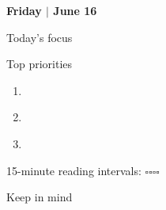 \documentclass{article}
\newcommand{\mydots}{\textcolor{black!20!white}{\tiny\dotfill}}
\newcommand{\mydailyheading}[2]{{
    \fontsize{30}{32}\selectfont\bfseries\color{mypur}#1%
    \hspace{1mm}\color{black}$\vert$%
    \hspace{1mm}\fontsize{16}{18}\selectfont\bfseries\color{myblue}#2}
}
\begin{document}
\begin{day}



\newpage
\null\par\hfill\mydailyheading{Friday}{June 16}\hspace{4mm}
\par\vspace{0.5cm}

\begin{minipage}{0.5\textwidth}
    \begin{tcolorbox}[width=0.98\textwidth,height=0.8in]
        Today's focus
    \end{tcolorbox}
    \begin{tcolorbox}[width=0.98\textwidth,height=1.3in]
        Top priorities
        \begin{enumerate}[leftmargin=*,topsep=15pt,noitemsep,parsep=5pt]
            \item \mydots \par
            \item \mydots \par
            \item \mydots \par
        \end{enumerate}
    \end{tcolorbox}
\end{minipage}
\begin{minipage}{0.5\textwidth}
    \begin{tcolorbox}[width=0.9\textwidth,height=0.4in]
        15-minute reading intervals: {\Large \hfill$\square$\hfill$\square$\hfill$\square$\hfill$\square$}
    \end{tcolorbox}
    \begin{tcolorbox}[width=0.9\textwidth,height=1.7in]
        Keep in mind
    \end{tcolorbox}
\end{minipage}

\vspace{0.3cm}


\end{day}
\end{document}
